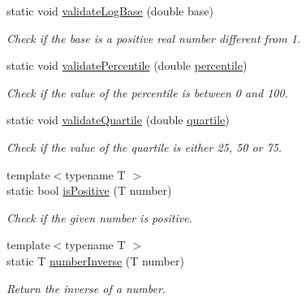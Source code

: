 \begin{DoxyCompactItemize}
static void \hyperlink{classmultiscale_1_1Numeric_a5d8734939e6074e75f6363ac4cfb8d45}{validate\-Log\-Base} (double base)
\begin{DoxyCompactList}\small\item\em \-Check if the base is a positive real number different from 1. \end{DoxyCompactList}\item 
static void \hyperlink{classmultiscale_1_1Numeric_abe940f7b4f7320912b34590d8297ab7e}{validate\-Percentile} (double \hyperlink{classmultiscale_1_1Numeric_aff0c6b0c3d82bec3761a5e2d08394513}{percentile})
\begin{DoxyCompactList}\small\item\em \-Check if the value of the percentile is between 0 and 100. \end{DoxyCompactList}\item 
static void \hyperlink{classmultiscale_1_1Numeric_aac8bb87dfc3d3f039089c7b1b5225641}{validate\-Quartile} (double \hyperlink{classmultiscale_1_1Numeric_a127a2b3e5e659b4e493767ba23fc45da}{quartile})
\begin{DoxyCompactList}\small\item\em \-Check if the value of the quartile is either 25, 50 or 75. \end{DoxyCompactList}\item 
{\footnotesize template$<$typename T $>$ }\\static bool \hyperlink{classmultiscale_1_1Numeric_ac35688ef6f37f33cdf8f91999c07f414}{is\-Positive} (\-T number)
\begin{DoxyCompactList}\small\item\em \-Check if the given number is positive. \end{DoxyCompactList}\item 
{\footnotesize template$<$typename T $>$ }\\static \-T \hyperlink{classmultiscale_1_1Numeric_a2ce4f8dbafed8f6af2a299ff66997318}{number\-Inverse} (\-T number)
\begin{DoxyCompactList}\small\item\em \-Return the inverse of a number. \end{DoxyCompactList}\end{DoxyCompactItemize}
